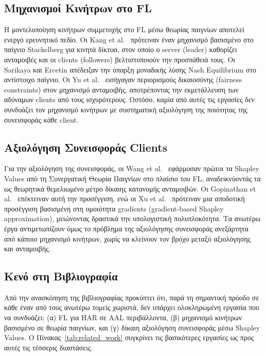 \subsection{Μηχανισμοί Κινήτρων στο FL}

Η μοντελοποίηση κινήτρων συμμετοχής στο FL μέσω θεωρίας παιγνίων
αποτελεί ενεργό ερευνητικό πεδίο. Οι Kang et al.\ \cite{Kang2019}
πρότειναν έναν μηχανισμό βασισμένο στο παίγνιο Stackelberg για κινητά
δίκτυα, στον οποίο ο server (leader) καθορίζει ανταμοιβές και οι clients
(followers) βελτιστοποιούν την προσπάθειά τους. Οι Sarikaya και Ercetin
\cite{Sarikaya2020} απέδειξαν την ύπαρξη μοναδικής λύσης Nash Equilibrium
στο αντίστοιχο παίγνιο. Οι Yu et al.\ \cite{Yu2020} εισήγαγαν περιορισμούς
δικαιοσύνης (fairness constraints) στον μηχανισμό ανταμοιβής, αποτρέποντας
την εκμετάλλευση των αδύναμων clients από τους ισχυρότερους. Ωστόσο,
καμία από αυτές τις εργασίες δεν συνδυάζει τον μηχανισμό κινήτρων με
συστηματική αξιολόγηση της ποιότητας της συνεισφοράς κάθε client.

\subsection{Αξιολόγηση Συνεισφοράς Clients}

Για την αξιολόγηση της συνεισφοράς, οι Wang et al.\ \cite{Wang2019}
εφάρμοσαν πρώτοι τα Shapley Values \cite{Shapley1953} από τη Συνεργατική
Θεωρία Παιγνίων στο πλαίσιο του FL, αναδεικνύοντάς τα ως θεωρητικά
θεμελιωμένο μέτρο δίκαιης κατανομής ανταμοιβών. Οι Gopinathan et al.\
\cite{Gopinathan2023} επέκτειναν αυτή την προσέγγιση, ενώ οι Xu et al.\
\cite{Xu2021} πρότειναν μια αποδοτική προσέγγιση βασισμένη στη ομοιότητα
gradients (gradient-based Shapley approximation), μειώνοντας δραστικά την
υπολογιστική πολυπλοκότητα. Τα ανωτέρω έργα αντιμετωπίζουν όμως το
πρόβλημα της αξιολόγησης συνεισφοράς ανεξάρτητα από κάποιο μηχανισμό
κινήτρων, χωρίς να κλείνουν τον βρόχο μεταξύ αξιολόγησης και
ανταμοιβής.

\subsection{Κενό στη Βιβλιογραφία}

Από την ανασκόπηση της βιβλιογραφίας προκύπτει ότι, παρά τη σημαντική
πρόοδο σε κάθε έναν από τους ανωτέρω τομείς χωριστά, δεν υπάρχει
ολοκληρωμένη εργασία που να συνδυάζει: (α) FL για HAR σε AAL περιβάλλοντα,
(β) μηχανισμό κινήτρων βασισμένο σε θεωρία παιγνίων, και (γ) δίκαιη
αξιολόγηση συνεισφοράς μέσω Shapley Values. Ο Πίνακας~\ref{tab:related_work}
συγκρίνει τις βασικότερες εργασίες ως προς αυτές τις τέσσερις διαστάσεις.


